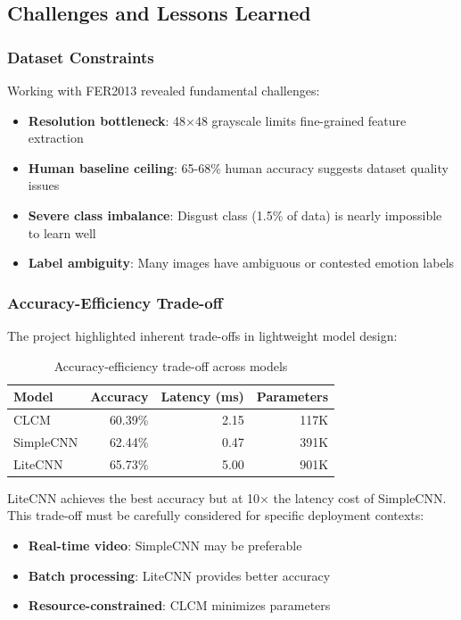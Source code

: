 \documentclass[12pt,a4paper]{article}
\begin{document}
\subsection{Challenges and Lessons Learned}

\subsubsection{Dataset Constraints}
Working with FER2013 revealed fundamental challenges:
\begin{itemize}[leftmargin=*]
    \item \textbf{Resolution bottleneck}: 48×48 grayscale limits fine-grained feature extraction
    \item \textbf{Human baseline ceiling}: 65-68\% human accuracy suggests dataset quality issues
    \item \textbf{Severe class imbalance}: Disgust class (1.5\% of data) is nearly impossible to learn well
    \item \textbf{Label ambiguity}: Many images have ambiguous or contested emotion labels
\end{itemize}

\subsubsection{Accuracy-Efficiency Trade-off}
The project highlighted inherent trade-offs in lightweight model design:
\begin{table}[h!]
\centering
\begin{tabular}{lrrr}
\toprule
Model & Accuracy & Latency (ms) & Parameters \\
\midrule
CLCM & 60.39\% & 2.15 & 117K \\
SimpleCNN & 62.44\% & 0.47 & 391K \\
LiteCNN & 65.73\% & 5.00 & 901K \\
\bottomrule
\end{tabular}
\caption{Accuracy-efficiency trade-off across models}
\end{table}

LiteCNN achieves the best accuracy but at 10× the latency cost of SimpleCNN. This trade-off must be carefully considered for specific deployment contexts:
\begin{itemize}[leftmargin=*]
    \item \textbf{Real-time video}: SimpleCNN may be preferable
    \item \textbf{Batch processing}: LiteCNN provides better accuracy
    \item \textbf{Resource-constrained}: CLCM minimizes parameters
\end{itemize}
\end{document}
